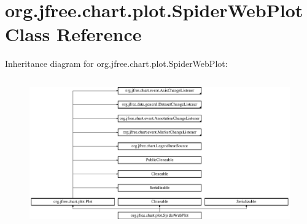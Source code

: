 \hypertarget{classorg_1_1jfree_1_1chart_1_1plot_1_1_spider_web_plot}{}\section{org.\+jfree.\+chart.\+plot.\+Spider\+Web\+Plot Class Reference}
\label{classorg_1_1jfree_1_1chart_1_1plot_1_1_spider_web_plot}
Inheritance diagram for org.\+jfree.\+chart.\+plot.\+Spider\+Web\+Plot\+:\begin{figure}[H]
\begin{center}
\leavevmode
\includegraphics[height=6.436782cm]{classorg_1_1jfree_1_1chart_1_1plot_1_1_spider_web_plot}
\end{center}
\end{figure}
